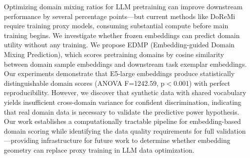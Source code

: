 Optimizing domain mixing ratios for LLM pretraining can improve downstream performance by several percentage points---but current methods like DoReMi require training proxy models, consuming substantial compute before main training begins. We investigate whether frozen embeddings can predict domain utility without any training. We propose EDMP (Embedding-guided Domain Mixing Prediction), which scores pretraining domains by cosine similarity between domain sample embeddings and downstream task exemplar embeddings. Our experiments demonstrate that E5-large embeddings produce statistically distinguishable domain scores (ANOVA F=1242.59, p$<$0.001) with perfect reproducibility. However, we discover that synthetic data with shared vocabulary yields insufficient cross-domain variance for confident discrimination, indicating that real domain data is necessary to validate the predictive power hypothesis. Our work establishes a computationally tractable pipeline for embedding-based domain scoring while identifying the data quality requirements for full validation---providing infrastructure for future work to determine whether embedding geometry can replace proxy training in LLM data optimization.

